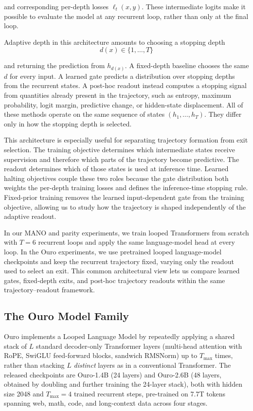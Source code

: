 \documentclass[10pt]{article} %
\begin{document}
and corresponding per-depth losses \(\ell_t(x,y)\). These intermediate logits make it possible to evaluate the model at any recurrent loop, rather than only at the final loop.

Adaptive depth in this architecture amounts to choosing a stopping depth
\[
d(x)\in\{1,\ldots,T\}
\]

and returning the prediction from \(h_{d(x)}\). A fixed-depth baseline chooses the same \(d\) for every input. A learned gate predicts a distribution over stopping depths from the recurrent states. A post-hoc readout instead computes a stopping signal from quantities already present in the trajectory, such as entropy, maximum probability, logit margin, predictive change, or hidden-state displacement. All of these methods operate on the same sequence of states \((h_1,\ldots,h_T)\). They differ only in how the stopping depth is selected.

This architecture is especially useful for separating trajectory formation from exit selection. The training objective determines which intermediate states receive supervision and therefore which parts of the trajectory become predictive. The readout determines which of those states is used at inference time. Learned halting objectives couple these two roles because the gate distribution both weights the per-depth training losses and defines the inference-time stopping rule. Fixed-prior training removes the learned input-dependent gate from the training objective, allowing us to study how the trajectory is shaped independently of the adaptive readout.

In our MANO and parity experiments, we train looped Transformers from scratch with \(T=6\) recurrent loops and apply the same language-model head at every loop. In the Ouro experiments, we use pretrained looped language-model checkpoints and keep the recurrent trajectory fixed, varying only the readout used to select an exit. This common architectural view lets us compare learned gates, fixed-depth exits, and post-hoc trajectory readouts within the same trajectory--readout framework.

\subsection{The Ouro Model Family}
\label{app:ouro-background}

Ouro \citep{Ouro} implements a Looped Language Model by repeatedly applying a shared stack of $L$ standard decoder-only Transformer layers (multi-head attention with RoPE, SwiGLU feed-forward blocks, sandwich RMSNorm) up to $T_{\max}$ times, rather than stacking $L$ \emph{distinct} layers as in a conventional Transformer. The released checkpoints are Ouro-1.4B (24 layers) and Ouro-2.6B (48 layers, obtained by doubling and further training the 24-layer stack), both with hidden size 2048 and $T_{\max}=4$ trained recurrent steps, pre-trained on 7.7T tokens spanning web, math, code, and long-context data across four stages.
\end{document}
